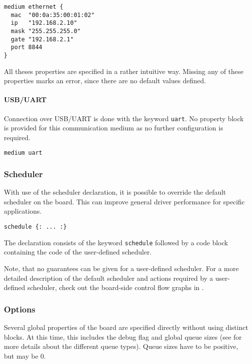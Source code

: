 \documentclass{report}
\begin{document}
\begin{lstlisting}[language=bdl]
medium ethernet {
  mac  "00:0a:35:00:01:02"
  ip   "192.168.2.10"
  mask "255.255.255.0"
  gate "192.168.2.1"
  port 8844
}
\end{lstlisting}

All theses properties are specified in a rather intuitive way. Missing any of these properties marks an error, since there are no default values defined.

\paragraph{USB/UART}
Connection over USB/UART is done with the keyword \texttt{uart}. No property block is provided for this communication medium as no further configuration is required.

\begin{lstlisting}[language=bdl]
medium uart
\end{lstlisting}

\subsubsection{Scheduler}
With use of the scheduler declaration, it is possible to override the default scheduler on the board. This can improve general driver performance for specific applications.

\begin{lstlisting}[language=bdl]
schedule {: ... :}
\end{lstlisting}

The declaration consists of the keyword \texttt{schedule} followed by a code block containing the code of the user-defined scheduler.

Note, that no guarantees can be given for a user-defined scheduler. For a more detailed description of the default scheduler and actions required by a user-defined scheduler, check out the board-side control flow graphs in .

\subsubsection{Options}
Several global properties of the board are specified directly without using distinct blocks. At this time, this includes the debug flag and global queue sizes (see  for more details about the different queue types). Queue sizes have to be positive, but may be 0.
\end{document}
